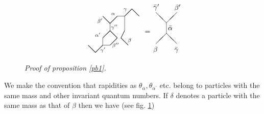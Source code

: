 \documentclass[a4paper,a4paper]{article}
\begin{document}
\begin{figure}[tbh]
\begin{gather*}
\begin{array}{l}
\unitlength 3.60mm\linethickness{0.4pt}\begin{picture}(7,6)
\put(0,1){\line(1,-1){1}} \put(1,0){\line(1,1){1}} \put(2,1){\line(0,1){1}}
\put(2,2){\line(1,1){1}} \put(3,3){\line(0,1){1}} \put(3,4){\line(-1,1){1}}
\put(3,4){\line(1,1){1}} \put(4,5){\line(1,0){1}} \put(5,5){\line(1,1){1}}
\put(6,6){\line(1,-1){1}} \put(5,5){\line(0,-1){2}}
\put(5,3){\line(-1,-2){0.50}} \put(4.50,2){\line(1,-1){1}}
\put(3,3){\line(1,-1){1}} \put(4,2){\line(-1,-1){1}}
\put(3,1){\line(-1,0){1}}
\put(2.02,0.33){\makebox(0,0)[cc]{$\scriptstyle\gamma'$}}
\put(1.33,2.45){\makebox(0,0)[cc]{$\scriptstyle\alpha'$}}
\put(3.77,0.97){\makebox(0,0)[cc]{$\scriptstyle\beta''$}}
\put(3.58,3.48){\makebox(0,0)[cc]{$\scriptstyle\gamma''$}}
\put(1.62,4.33){\makebox(0,0)[cc]{$\scriptstyle\beta'$}}
\put(3.43,5.30){\makebox(0,0)[cc]{$\scriptstyle\alpha$}}
\put(5.08,5.87){\makebox(0,0)[cc]{$\scriptstyle\gamma$}}
\put(5.68,1.65){\makebox(0,0)[cc]{$\scriptstyle\beta$}} \end{picture}
\end{array}
= 
\begin{array}{l}
\unitlength 2.6mm\begin{picture}(4,7) \put(0,1){\line(1,1){2}}
\put(4,1){\line(-1,1){2}} \put(2,3){\line(0,1){2}} \put(0,7){\line(1,-1){2}}
\put(4,7){\line(-1,-1){2}} \put(-.5,-.5){$\beta$}
\put(3.5,-.5){$\bar\gamma$} \put(2.3,3.6){$\bar\alpha$}
\put(-.5,7.6){$\bar\gamma'$} \put(3.5,7.5){$\beta'$} \end{picture}
\end{array}
\end{gather*}
\caption{\textit{Proof of proposition \ref{pb1}.}}
\label{fb20}
\end{figure}
We make the convention that rapidities as $\theta _{\alpha },\theta _{\alpha
^{\prime }}$ etc. belong to particles with the same mass and other invariant
quantum numbers. If $\delta $ denotes a particle with the same mass as that
of $\beta $ then we have (see fig. \ref{fb20}) 
\end{document}
